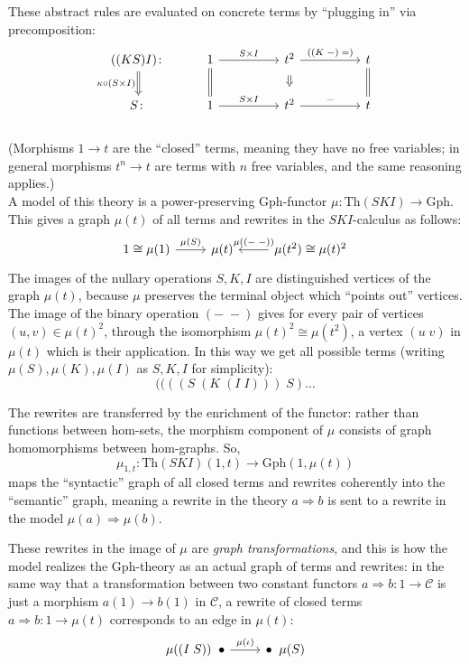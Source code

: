 \documentclass{amsart}
\theoremstyle{definition}
\newcommand{\Th}{\mathrm{Th}}
\newcommand{\Gph}{\mathrm{Gph}}
\newcommand{\C}{\mathscr{C}}
\newcommand{\maps}{\colon}
\begin{document}
These abstract rules are evaluated on concrete terms by ``plugging in'' via precomposition:
\[\begin{tikzcd}
	((KS)I)\maps \arrow[Rightarrow,d,swap,"\kappa \circ (S\times I)"] & 1 \arrow[d,equal] \arrow[rr,"S\times I"] && t^2 \arrow[Rightarrow,d,shorten >=0.2cm,shorten <=0.2cm] \arrow[rr,"((K\; -)\; =)"] && t \arrow[d,equal]\\
	S\maps & 1 \arrow[rr,"S\times I"] && t^2 \arrow[rr,"-"] && t
\end{tikzcd}\]\\
(Morphisms $1\to t$ are the ``closed'' terms, meaning they have no free variables; in general morphisms $t^n\to t$ are terms with $n$ free variables, and the same reasoning applies.)\\

A model of this theory is a power-preserving $\Gph$-functor $\mu\maps \Th(SKI) \to \Gph$. This gives a graph $\mu(t)$ of all terms and rewrites in the $SKI$-calculus as follows:
\[\begin{tikzcd}
1 \cong \mu(1) \arrow[r,"\mu(S)"] & \mu(t) & \mu(t^2) \arrow[l,swap,"\mu(\left(-\;-\right))"] \cong \mu(t)^2
\end{tikzcd}\]
The images of the nullary operations $S,K,I$ are distinguished vertices of the graph $\mu(t)$, because $\mu$ preserves the terminal object which ``points out'' vertices. The image of the binary operation $(-\; -)$ gives for every pair of vertices $(u,v) \in \mu(t)^2$, through the isomorphism $\mu(t)^2 \cong \mu(t^2)$, a vertex $(u\; v)$ in $\mu(t)$ which is their application. In this way we get all possible terms (writing $\mu(S),\mu(K),\mu(I)$ as $S,K,I$ for simplicity): $$((((S\; (K\; (I\; I)))\; S) \dots$$

The rewrites are transferred by the enrichment of the functor: rather than functions between hom-sets, the morphism component of $\mu$ consists of graph homomorphisms between hom-graphs. So, $$\mu_{1,t}\maps \Th(SKI)(1,t)\to \Gph(1,\mu(t))$$ maps the ``syntactic'' graph of all closed terms and rewrites coherently into the ``semantic'' graph, meaning a rewrite in the theory $a\Rightarrow b$ is sent to a rewrite in the model $\mu(a) \Rightarrow \mu(b)$.

These rewrites in the image of $\mu$ are \textit{graph transformations}, and this is how the model realizes the $\Gph$-theory as an actual graph of terms and rewrites: in the same way that a transformation between two constant functors $a\Rightarrow b\maps 1\to \C$ is just a morphism $a(1)\to b(1)$ in $\C$, a rewrite of closed terms $a\Rightarrow b\maps 1\to \mu(t)$ corresponds to an edge in $\mu(t)$:
\[\begin{tikzcd}
	\mu((I\; S)) \;\; \bullet \arrow[r,"\mu(\iota)"] & \bullet \;\; \mu(S)
\end{tikzcd}\]
\end{document}
